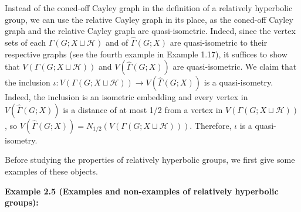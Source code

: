\documentclass[12pt]{article}
\newcommand{\vs}{\vskip10pt}
\begin{document}
	\vs 
	
	Instead of the coned-off Cayley graph in the definition of a relatively hyperbolic group, we can use the relative Cayley graph in its place, as the coned-off Cayley graph and the relative Cayley graph are quasi-isometric. Indeed, since the vertex sets of each $\Gamma(G; X \sqcup \mathcal{H})$ and of $\hat{\Gamma}(G;X)$ are quasi-isometric to their respective graphs (see the fourth example in Example 1.17), it suffices to show that $V(\Gamma(G; X \sqcup \mathcal{H}))$ and $V(\hat{\Gamma}(G;X))$ are quasi-isometric. We claim that the inclusion $\iota: V(\Gamma(G; X \sqcup \mathcal{H})) \rightarrow V(\hat{\Gamma}(G;X))$ is a quasi-isometry. Indeed, the inclusion is an isometric embedding and every vertex in $V(\hat{\Gamma}(G;X))$ is a distance of at most 1/2 from a vertex in $V(\Gamma(G; X \sqcup \mathcal{H}))$, so $V(\hat{\Gamma}(G;X)) = N_{1/2} (V(\Gamma(G; X \sqcup \mathcal{H})))$. Therefore, $\iota$ is a quasi-isometry. 
	
	\vs
	
	Before studying the properties of relatively hyperbolic groups, we first give some examples of these objects. 
	
	\vs 
	
	\textbf{Example 2.5 (Examples and non-examples of relatively hyperbolic groups): } 
	
\end{document}

